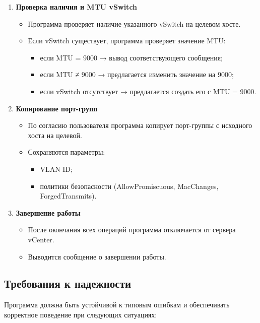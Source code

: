 \begin{enumerate}
    \item \textbf{Проверка наличия и MTU vSwitch}
    \begin{itemize}
        \item Программа проверяет наличие указанного vSwitch на целевом хосте.
        \item Если vSwitch существует, программа проверяет значение MTU:
        \begin{itemize}
            \item если MTU = 9000 → вывод соответствующего сообщения;
            \item если MTU ≠ 9000 → предлагается изменить значение на 9000;
            \item если vSwitch отсутствует → предлагается создать его с MTU = 9000.
        \end{itemize}
    \end{itemize}
    
    \item \textbf{Копирование порт-групп}
    \begin{itemize}
        \item По согласию пользователя программа копирует порт-группы с исходного хоста на целевой.
        \item Сохраняются параметры:
        \begin{itemize}
            \item VLAN ID;
            \item политики безопасности (AllowPromiscuous, MacChanges, ForgedTransmits).
        \end{itemize}
    \end{itemize}
    
    \item \textbf{Завершение работы}
    \begin{itemize}
        \item После окончания всех операций программа отключается от сервера vCenter.
        \item Выводится сообщение о завершении работы.
    \end{itemize}
\end{enumerate}

\subsection{Требования к надежности}
Программа должна быть устойчивой к типовым ошибкам и обеспечивать корректное поведение при следующих ситуациях:

